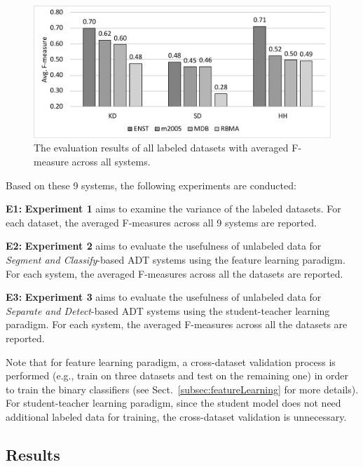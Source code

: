\documentclass{article}
\begin{document}
\begin{figure}
\centering
\includegraphics[width = \columnwidth]{./figs/avgAcrossDatasets.pdf}
\caption{The evaluation results of all labeled datasets with averaged F-measure across all systems.}
\label{fig:resultsAcrossDatasets}
\end{figure}

Based on these 9 systems, the following experiments are conducted:
\begin{compactenum}
\item [\textbf{E1:}]\textbf{Experiment 1} aims to examine the variance of the labeled datasets. For each dataset, the averaged F-measures across all 9 systems are reported. 
\item [\textbf{E2:}]\textbf{Experiment 2} aims to evaluate the usefulness of unlabeled data for \textit{Segment and Classify}-based ADT systems using the feature learning paradigm. For each system, the averaged F-measures across all the datasets are reported. 
\item [\textbf{E3:}]\textbf{Experiment 3} aims to evaluate the usefulness of unlabeled data for \textit{Separate and Detect}-based ADT systems using the student-teacher learning paradigm. For each system, the averaged F-measures across all the datasets are reported. 
\end{compactenum}

Note that for feature learning paradigm, a cross-dataset validation process is performed (e.g., train on three datasets and test on the remaining one) in order to train the binary classifiers (see Sect.~\ref{subsec:featureLearning} for more details). For student-teacher learning paradigm, since the student model does not need additional labeled data for training, the cross-dataset validation is unnecessary. 

\subsection{Results}
\end{document}
